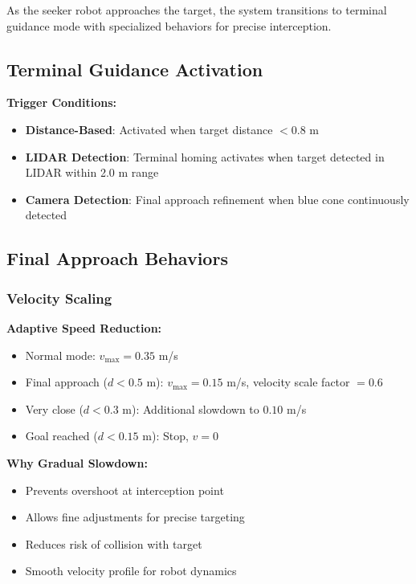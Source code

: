\documentclass[11pt]{article}
\begin{document}
As the seeker robot approaches the target, the system transitions to terminal guidance mode with specialized behaviors for precise interception.

\subsection{Terminal Guidance Activation}

\textbf{Trigger Conditions:}
\begin{itemize}
    \item \textbf{Distance-Based}: Activated when target distance $< 0.8$ m
    \item \textbf{LIDAR Detection}: Terminal homing activates when target detected in LIDAR within 2.0 m range
    \item \textbf{Camera Detection}: Final approach refinement when blue cone continuously detected
\end{itemize}

\subsection{Final Approach Behaviors}

\subsubsection{Velocity Scaling}

\textbf{Adaptive Speed Reduction:}
\begin{itemize}
    \item Normal mode: $v_{\max} = 0.35$ m/s
    \item Final approach ($d < 0.5$ m): $v_{\max} = 0.15$ m/s, velocity scale factor $= 0.6$
    \item Very close ($d < 0.3$ m): Additional slowdown to $0.10$ m/s
    \item Goal reached ($d < 0.15$ m): Stop, $v = 0$
\end{itemize}

\textbf{Why Gradual Slowdown:}
\begin{itemize}
    \item Prevents overshoot at interception point
    \item Allows fine adjustments for precise targeting
    \item Reduces risk of collision with target
    \item Smooth velocity profile for robot dynamics
\end{itemize}
\end{document}
